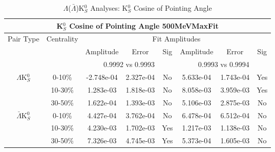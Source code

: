 \documentclass[../AnalysisNoteJBuxton.tex]{subfiles}
\begin{document}
\begin{table}
 \centering
 \begin{tabular}{|c|c|c|c|c||c|c|c|}
  \multicolumn{8}{c}{K$^{0}_{S}$ Cosine of Pointing Angle 500MeVMaxFit} \\
  \hline
  \multirow{3}{*}{Pair Type} & \multirow{3}{*}{Centrality} & \multicolumn{6}{c|}{Fit Amplitudes} \\
  \cline{3-8}
   & & Amplitude & Error & Sig & Amplitude & Error & Sig \\  
  \cline{3-8}
   & & \multicolumn{3}{c||}{0.9992 vs 0.9993} & \multicolumn{3}{c|}{0.9993 vs 0.9994} \\  
  \hline  
  \multirow{3}{*}{$\Lambda$K$^{0}_{S}$}  
   &  0-10\% & -2.748e-04 & 2.327e-04 & No & 5.633e-04 & 1.743e-04 & Yes \\
   & 10-30\% & 1.283e-03 & 1.818e-03 & No & 8.058e-03 & 3.959e-03 & Yes \\
   & 30-50\% & 1.622e-04 & 1.393e-03 & No & 5.106e-03 & 2.875e-03 & No \\
  \hline  
  \multirow{3}{*}{$\bar{\Lambda}$K$^{0}_{S}$}  
   &  0-10\% & 4.427e-04 & 3.762e-04 & No & 6.478e-04 & 6.512e-04 & No \\
   & 10-30\% & 4.230e-03 & 1.702e-03 & Yes & 1.217e-03 & 1.138e-03 & No \\
   & 30-50\% & 7.326e-03 & 4.745e-03 & Yes & 5.373e-04 & 1.605e-03 & No \\
  \hline
 \end{tabular}
 \caption{$\Lambda$($\bar{\Lambda}$)K$^{0}_{S}$ Analyses: K$^{0}_{S}$ Cosine of Pointing Angle}
 \label{tab:K0CosPointingAngleLamK0_500MeVMaxFit}
\end{table}
\end{document}
